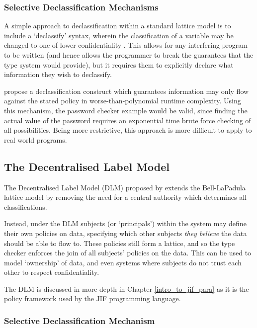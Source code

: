 \subsubsection{Selective Declassification Mechanisms}

A simple approach to declassification within a standard lattice model is to include a `declassify' syntax, wherein the classification of a variable may be changed to one of lower confidentiality \cite{denning1974declassification}. This allows for any interfering program to be written (and hence allows the programmer to break the guarantees that the type system would provide), but it requires them to explicitly declare what information they  wish to declassify.

\citeauthor{volpano2000declassification} \cite{volpano2000declassification} propose a declassification construct which guarantees information may only flow against the stated policy in worse-than-polynomial runtime complexity. Using this mechanism, the password checker example would be valid, since finding the actual value of the password requires an exponential time brute force checking of all possibilities. Being more restrictive, this approach is more difficult to apply to real world programs.

\subsection{The Decentralised Label Model} \label{theory_if_dlm}

The Decentralised Label Model (DLM) proposed by \citeauthor{myers1997if} \cite{myers1997if} extends the Bell-LaPadula lattice model by removing the need for a central authority which determines all classifications.

Instead, under the DLM subjects (or `principals') within the system may define their own policies on data, specifying which other subjects \textit{they believe} the data should be able to flow to. These policies still form a lattice, and so the type checker enforces the join of all subjects' policies on the data. This can be used to model `ownership' of data, and even systems where subjects do not trust each other to respect confidentiality.

The DLM is discussed in more depth in Chapter \ref{intro_to_jif_para} as it is the policy framework used by the JIF programming language.

\subsubsection{Selective Declassification Mechanism}

